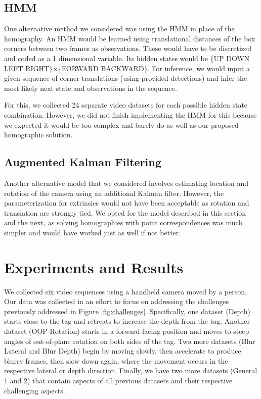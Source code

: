 \documentclass[letterpaper,10pt,conference]{IEEEtran}
\begin{document}
\subsection{HMM}
One alternative method we considered was using the HMM in place of the homography. An HMM would be learned using translational distances of the box corners between two frames as observations. These would have to be discretized and coded as a 1 dimensional variable. Its hidden states would be \{UP DOWN LEFT RIGHT\}$\times$\{FORWARD BACKWARD\}. For inference, we would input a given sequence of corner translations (using provided detections) and infer the most likely next state and observations in the sequence.

For this, we collected 24 separate video datasets for each possible hidden state combination. However, we did not finish implementing the HMM for this because we expected it would be too complex and  barely do as well as our proposed homographic solution.
\subsection{Augmented Kalman Filtering}
Another alternative model that we considered involves estimating location and rotation of the camera using an additional Kalman filter.  However, the parameterization for extrinsics would not have been acceptable as rotation and translation are strongly tied.  We opted for the model described in this section and the next, as solving homographies with point correspondences was much simpler and would have worked just as well if not better.








\section{Experiments and Results}
\label{sec:results}
We collected six video sequences using a handheld camera moved by a person. Our data was collected in an effort to focus on addressing the challenges previously addressed in Figure \ref{fig:challenges}. Specifically, one dataset (Depth) starts close to the tag and retreats to increase the depth from the tag. Another dataset (OOP Rotation) starts in a forward facing position and moves to steep angles of out-of-plane rotation on both sides of the tag. Two more datasets (Blur Lateral and Blur Depth) begin by moving slowly, then accelerate to produce blurry frames, then slow down again, where the movement occurs in the respective lateral or depth direction. Finally, we have two more datasets (General 1 and 2) that contain aspects of all previous datasets and their respective challenging aspects.
\end{document}
